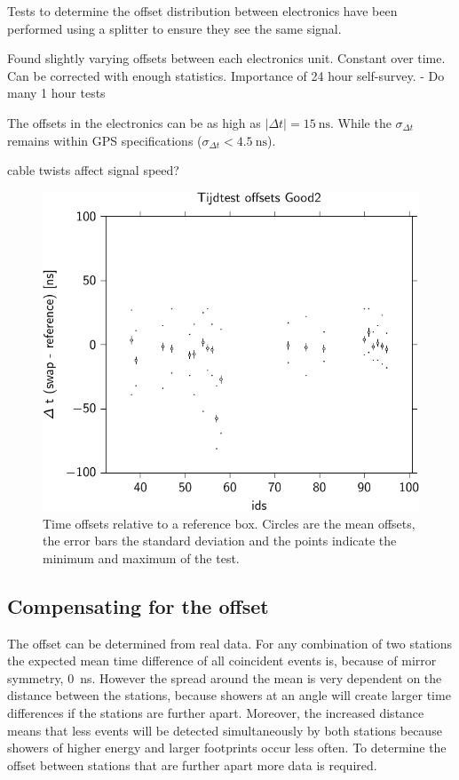 Tests to determine the offset distribution between \hisparc electronics have been performed using a \gps splitter to ensure they see the same \gps signal.

Found slightly varying offsets between each \hisparc electronics unit. Constant over time. Can be corrected with enough statistics. Importance of 24 hour self-survey. - Do many 1 hour tests


The offsets in the \hisparc electronics can be as high as $|\Delta t| = \SI{15}{\ns}$. While the $\sigma_{\Delta t}$ remains within GPS specifications ($\sigma_{\Delta t} < \SI{4.5}{\ns}$).


\gps cable twists affect signal speed?

\begin{figure}
    \centering
    \includegraphics{plots/calibration/hisparc_offsets}
    \caption{Time offsets relative to a reference box. Circles are the
             mean offsets, the error bars the standard deviation and the
             points indicate the minimum and maximum of the test.}
    \label{fig:hisparc_offsets}
\end{figure}


\subsection{Compensating for the offset}

The offset can be determined from real data. For any combination of two stations the expected mean time difference of all coincident events is, because of mirror symmetry, \SI{0}{\ns}. However the spread around the mean is very dependent on the distance between the stations, because showers at an angle will create larger time differences if the stations are further apart. Moreover, the increased distance means that less events will be detected simultaneously by both stations because showers of higher energy and larger footprints occur less often. To determine the offset between stations that are further apart more data is required.
